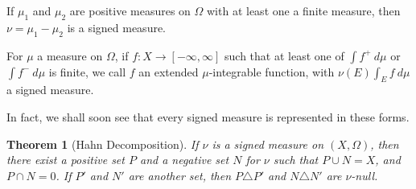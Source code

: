 \documentclass[10pt]{extarticle}
\theoremstyle{plain}
\newtheorem*{theorem}{Theorem}
\theoremstyle{definition}
\theoremstyle{note}
\renewcommand{\newline}{\hfill\break}
\begin{document}
If $\mu_1$ and $\mu_2$ are positive measures on $\Omega$ with at least one a finite measure, then $\nu = \mu_1 - \mu_2$ is a signed measure.\newline

For $\mu$ a measure on $\Omega$, if $f: X\rightarrow [-\infty,\infty]$ such that at least one of $\int f^{+}\:d\mu$ or $\int f^{-}\:d\mu$ is finite, we call $f$ an extended $\mu$-integrable function, with $\nu(E)\int_{E}f\:d\mu$ a signed measure.\newline

In fact, we shall soon see that every signed measure is represented in these forms.
\begin{theorem}[Hahn Decomposition]
  If $\nu$ is a signed measure on $\left(X,\Omega\right)$, then there exist a positive set $P$ and a negative set $N$ for $\nu$ such that $P\cup N = X$, and $P\cap N = 0$. If $P'$ and $N'$ are another set, then $P\triangle P'$ and $N\triangle N'$ are $\nu$-null.
\end{theorem}
\end{document}
